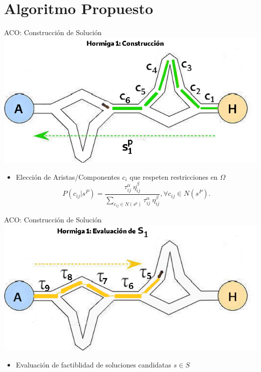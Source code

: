 \section{Algoritmo Propuesto}
\begin{frame}{ACO: Construcci\'on de Soluci\'on}
\centering
\includegraphics[scale=0.35]{Pictures/ACO-ant-Constr.png}
\begin{itemize}
    \item Elecci\'on de Aristas/Componentes $c_i$ que respeten restricciones en $\Omega$
    \begin{equation}
P(c_{ij} | s^{P}) = \frac
        {\tau_{ij}^{\alpha} ~ \eta_{ij}^{\beta}}
        {\sum\limits_{c_{ij}\in N(s^p)}{\tau_{ij}^{\alpha} ~ \eta_{ij}^{\beta} } }, \forall c_{ij} \in N(s^{P}).
\label{eq:antProbabilities}
\end{equation}
\end{itemize}
\end{frame}

\begin{frame}{ACO: Construcci\'on de Soluci\'on}
\centering
\includegraphics[scale=0.4]{Pictures/ACO-ant-ferom.png}
\begin{itemize}
    \item Evaluaci\'on de factiblidad de soluciones candidatas $s \in S$
\end{itemize}
\end{frame}





